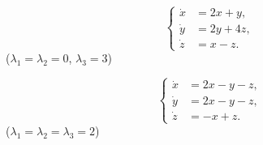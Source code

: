 \begin{multicols}{2}
    \begin{problem}
        \[ \left\{ \begin{aligned} 
            \dot x &= 2 x + y, \\
            \dot y &= 2 y + 4 z, \\
            \dot z &= x - z.
        \end{aligned} \right. \]
        ($\lambda_1 = \lambda_2 = 0$, $\lambda_3 = 3$)
    \end{problem}
    
    \begin{problem}
        \[ \left\{ \begin{aligned} 
            \dot x &= 2 x - y - z, \\
            \dot y &= 2 x - y - z, \\
            \dot z &= - x + z.
        \end{aligned} \right. \]
        ($\lambda_1 = \lambda_2 = \lambda_3 = 2$)
    \end{problem}
\end{multicols}
